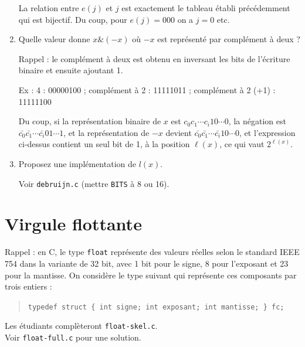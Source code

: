 \documentclass[11pt]{article}
\begin{document}
\begin{enumerate}
\begin{solution}
La relation entre $e(j)$ et $j$ est exactement le tableau établi
précédemment qui est bijectif. Du coup, pour $e(j)=000$
on a $j=0$ etc.
\end{solution}

 \item Quelle valeur donne $x\mathbin{\&}(-x)$
où $-x$ est représenté par complément à deux ?

\begin{solution}
Rappel : le complément à deux est obtenu en inversant les bits de l'écriture
binaire et ensuite ajoutant 1.

Ex : 4 : 00000100 ; complément à 2 : 11111011 ; complément à 2 (+1) : 11111100

Du coup, si la représentation binaire de $x$ est $c_0c_1\cdots c_i10\cdots 0$,
la négation est $\bar{c_0}\bar{c_1}\cdots\bar{c_i}01\cdots 1$, et
la représentation de $-x$ devient $\bar{c_0}\bar{c_1}\cdots\bar{c_i}10\cdots 0$,
et l'expression ci-dessus contient un seul bit de 1, à la position $\ell(x)$,
ce qui vaut $2^{\ell(x)}$.
\end{solution}

 \item Proposez une implémentation de $l(x)$.

\begin{solution}
Voir \verb+debruijn.c+ (mettre \verb+BITS+ à 8 ou 16).
\end{solution}

\end{enumerate}



\section{Virgule flottante}

Rappel : en C, le type \texttt{float} représente des valeurs réelles
selon le standard IEEE 754 dans la variante de 32 bit, avec 1 bit pour
le signe, 8 pour l'exposant et 23 pour la mantisse. On considère le
type suivant qui représente ces composants par trois entiers :

\begin{quote}
\verb+typedef struct { int signe; int exposant; int mantisse; } fc;+
\end{quote}

\begin{remarque}
Les étudiants complèteront \verb+float-skel.c+.\\
Voir \verb+float-full.c+ pour une solution.
\end{remarque}
\end{document}
